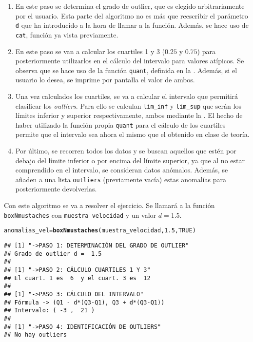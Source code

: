 \documentclass[12pt]{report}\usepackage[]{graphicx}\usepackage[dvipsnames]{xcolor}
\makeatletter
\newcommand{\hlnum}[1]{\textcolor[rgb]{0.686,0.059,0.569}{#1}}%
\newcommand{\hlstd}[1]{\textcolor[rgb]{0.345,0.345,0.345}{#1}}%
\newcommand{\hlkwb}[1]{\textcolor[rgb]{0.69,0.353,0.396}{#1}}%
\newcommand{\hlkwd}[1]{\textcolor[rgb]{0.737,0.353,0.396}{\textbf{#1}}}%
\newenvironment{kframe}{%
 \def\at@end@of@kframe{}%
 \ifinner\ifhmode%
  \def\at@end@of@kframe{\end{minipage}}%
  \begin{minipage}{\columnwidth}%
 \fi\fi%
 \def\FrameCommand##1{\hskip\@totalleftmargin \hskip-\fboxsep
 \colorbox{shadecolor}{##1}\hskip-\fboxsep
     \hskip-\linewidth \hskip-\@totalleftmargin \hskip\columnwidth}%
 \MakeFramed {\advance\hsize-\width
   \@totalleftmargin\z@ \linewidth\hsize
   \@setminipage}}%
 {\par\unskip\endMakeFramed%
 \at@end@of@kframe}
\newenvironment{knitrout}{}{} %
\makeatother
\begin{document}
					\begin{enumerate}[label = \textbf{\arabic*. }]
						\item En este paso se determina el grado de outlier, que es elegido arbitrariamente por el usuario. Esta parte del algoritmo no es más que reescribir el parámetro \texttt{d} que ha introducido a la hora de llamar a la función. Además, se hace uso de \texttt{cat}, función ya vista previamente.
						
						\item En este paso se van a calcular los cuartiles 1 y 3 ($0.25$ y $0.75$) para posteriormente utilizarlos en el cálculo del intervalo para valores atípicos. Se observa que se hace uso de la función \texttt{quant}, definida en la . Además, si el usuario lo desea, se imprime por pantalla el valor de ambos.
						
						\item Una vez calculados los cuartiles, se va a calcular el intervalo que permitirá clasificar los \textit{outliers}. Para ello se calculan \texttt{lim\_inf} y \texttt{lim\_sup} que serán los límites inferior y superior respectivamente, ambos mediante la . El hecho de haber utilizado la función propia \texttt{quant} para el cálculo de los cuartiles permite que el intervalo sea ahora el mismo que el obtenido en clase de teoría.
						
						\item Por último, se recorren todos los datos y se buscan aquellos que estén por debajo del límite inferior o por encima del límite superior, ya que al no estar comprendido en el intervalo, se consideran datos anómalos. Además, se añaden a una lista \texttt{outliers} (previamente vacía) estas anomalías para posteriormente devolverlas.
					\end{enumerate}
					
					Con este algoritmo se va a resolver el ejercicio. Se llamará a la función \texttt{boxNmustaches} con \texttt{muestra\_velocidad} y un valor $d = 1.5$.
					
\begin{knitrout}
\color{fgcolor}\begin{kframe}
\begin{alltt}
\hlstd{anomalias_vel} \hlkwb{=} \hlkwd{boxNmustaches}\hlstd{(muestra_velocidad,} \hlnum{1.5}\hlstd{,} \hlnum{TRUE}\hlstd{)}
\end{alltt}
\begin{verbatim}
## [1] "->PASO 1: DETERMINACIÓN DEL GRADO DE OUTLIER"
## Grado de outlier d =  1.5 
## 
## [1] "->PASO 2: CÁLCULO CUARTILES 1 Y 3"
## El cuart. 1 es  6  y el cuart. 3 es  12 
## 
## [1] "->PASO 3: CÁLCULO DEL INTERVALO"
## Fórmula -> (Q1 - d*(Q3-Q1), Q3 + d*(Q3-Q1))
## Intervalo: ( -3 ,  21 )
## 
## [1] "->PASO 4: IDENTIFICACIÓN DE OUTLIERS"
## No hay outliers
\end{verbatim}
\end{kframe}
\end{knitrout}
					
\end{document}
